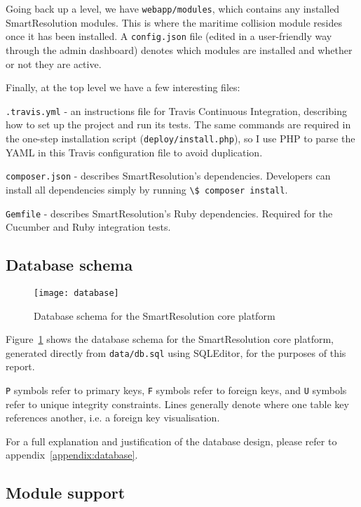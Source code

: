 Going back up a level, we have \lstinline{webapp/modules}, which contains any installed SmartResolution modules. This is where the maritime collision module resides once it has been installed. A \lstinline{config.json} file (edited in a user-friendly way through the admin dashboard) denotes which modules are installed and whether or not they are active.

Finally, at the top level we have a few interesting files:

\lstinline{.travis.yml} - an instructions file for Travis Continuous Integration, describing how to set up the project and run its tests. The same commands are required in the one-step installation script (\lstinline{deploy/install.php}), so I use PHP to parse the YAML in this Travis configuration file to avoid duplication.

\lstinline{composer.json} - describes SmartResolution's dependencies. Developers can install all dependencies simply by running \lstinline{\$ composer install}.

\lstinline{Gemfile} - describes SmartResolution's Ruby dependencies. Required for the Cucumber and Ruby integration tests.

\subsection{Database schema}

\begin{figure}[h!]
  \centering
    \texttt{[image: database]}
  \caption{Database schema for the SmartResolution core platform}
  \label{uml:databaseSchema}
\end{figure}

Figure~\ref{uml:databaseSchema} shows the database schema for the SmartResolution core platform, generated directly from \lstinline{data/db.sql} using SQLEditor, for the purposes of this report.

\lstinline{P} symbols refer to primary keys, \lstinline{F} symbols refer to foreign keys, and \lstinline{U} symbols refer to unique integrity constraints. Lines generally denote where one table key references another, i.e. a foreign key visualisation.

For a full explanation and justification of the database design, please refer to appendix~\ref{appendix:database}.

\subsection{Module support}


